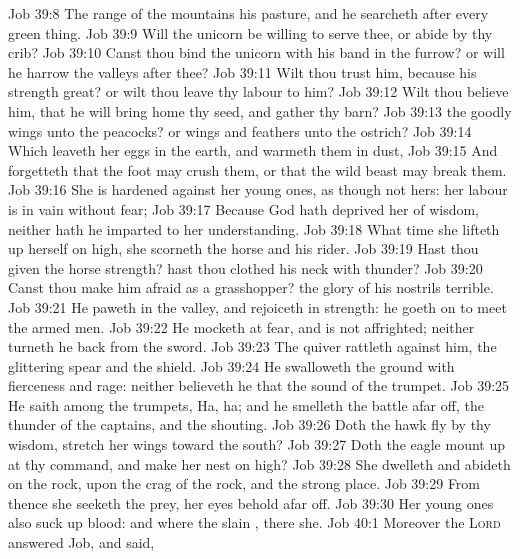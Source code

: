 \vs Job 39:8 The range of the mountains  his pasture, and he searcheth after every green thing.
\vs Job 39:9 Will the unicorn be willing to serve thee, or abide by thy crib?
\vs Job 39:10 Canst thou bind the unicorn with his band in the furrow? or will he harrow the valleys after thee?
\vs Job 39:11 Wilt thou trust him, because his strength  great? or wilt thou leave thy labour to him?
\vs Job 39:12 Wilt thou believe him, that he will bring home thy seed, and gather  thy barn?
\vs Job 39:13  the goodly wings unto the peacocks? or wings and feathers unto the ostrich?
\vs Job 39:14 Which leaveth her eggs in the earth, and warmeth them in dust,
\vs Job 39:15 And forgetteth that the foot may crush them, or that the wild beast may break them.
\vs Job 39:16 She is hardened against her young ones, as though  not hers: her labour is in vain without fear;
\vs Job 39:17 Because God hath deprived her of wisdom, neither hath he imparted to her understanding.
\vs Job 39:18 What time she lifteth up herself on high, she scorneth the horse and his rider.
\vs Job 39:19 Hast thou given the horse strength? hast thou clothed his neck with thunder?
\vs Job 39:20 Canst thou make him afraid as a grasshopper? the glory of his nostrils  terrible.
\vs Job 39:21 He paweth in the valley, and rejoiceth in  strength: he goeth on to meet the armed men.
\vs Job 39:22 He mocketh at fear, and is not affrighted; neither turneth he back from the sword.
\vs Job 39:23 The quiver rattleth against him, the glittering spear and the shield.
\vs Job 39:24 He swalloweth the ground with fierceness and rage: neither believeth he that  the sound of the trumpet.
\vs Job 39:25 He saith among the trumpets, Ha, ha; and he smelleth the battle afar off, the thunder of the captains, and the shouting.
\vs Job 39:26 Doth the hawk fly by thy wisdom,  stretch her wings toward the south?
\vs Job 39:27 Doth the eagle mount up at thy command, and make her nest on high?
\vs Job 39:28 She dwelleth and abideth on the rock, upon the crag of the rock, and the strong place.
\vs Job 39:29 From thence she seeketh the prey,  her eyes behold afar off.
\vs Job 39:30 Her young ones also suck up blood: and where the slain , there  she.
\vs Job 40:1 Moreover the \textsc{Lord} answered Job, and said,
